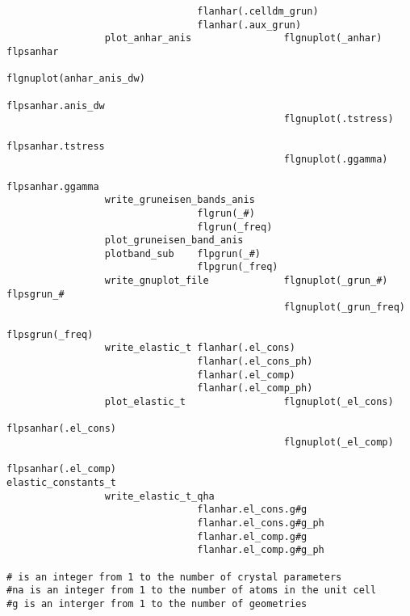 \documentclass[12pt,a4paper]{article}
\begin{document}
\begin{verbatim}
                                 flanhar(.celldm_grun)
                                 flanhar(.aux_grun)
                 plot_anhar_anis                flgnuplot(_anhar)   flpsanhar
                                                flgnuplot(anhar_anis_dw) 
                                                            flpsanhar.anis_dw
                                                flgnuplot(.tstress)  
                                                            flpsanhar.tstress
                                                flgnuplot(.ggamma)  
                                                            flpsanhar.ggamma
                 write_gruneisen_bands_anis
                                 flgrun(_#)
                                 flgrun(_freq)
                 plot_gruneisen_band_anis
                 plotband_sub    flpgrun(_#)
                                 flpgrun(_freq)
                 write_gnuplot_file             flgnuplot(_grun_#)   flpsgrun_#
                                                flgnuplot(_grun_freq) 
                                                                 flpsgrun(_freq)
                 write_elastic_t flanhar(.el_cons)
                                 flanhar(.el_cons_ph)
                                 flanhar(.el_comp)
                                 flanhar(.el_comp_ph)
                 plot_elastic_t                 flgnuplot(_el_cons)  
                                                           flpsanhar(.el_cons)
                                                flgnuplot(_el_comp)  
                                                           flpsanhar(.el_comp)
elastic_constants_t
                 write_elastic_t_qha
                                 flanhar.el_cons.g#g
                                 flanhar.el_cons.g#g_ph
                                 flanhar.el_comp.g#g
                                 flanhar.el_comp.g#g_ph

# is an integer from 1 to the number of crystal parameters
#na is an integer from 1 to the number of atoms in the unit cell
#g is an interger from 1 to the number of geometries
\end{verbatim} 

\newpage
\end{document}
